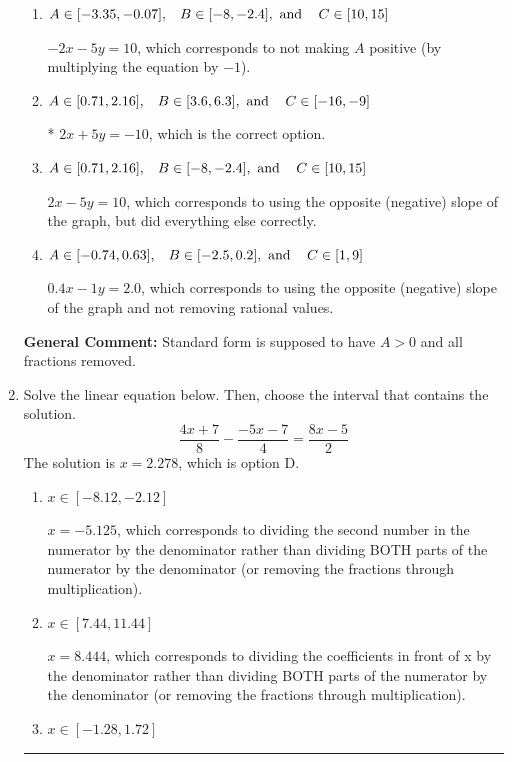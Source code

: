 \documentclass{extbook}[14pt]
\newcommand{\litem}[1]{\item #1

\rule{\textwidth}{0.4pt}}
\begin{document}
\begin{enumerate}
{\begin{enumerate}[label=\Alph*.]
 $0.4x + 1y = -2.0$, which corresponds to not removing rational values for Standard Form.
\item \( A \in [-3.35, -0.07], \hspace{3mm} B \in [-8, -2.4], \text{ and } \hspace{3mm} C \in [10, 15] \)

 $-2x - 5y = 10$, which corresponds to not making $A$ positive (by multiplying the equation by $-1$).
\item \( A \in [0.71, 2.16], \hspace{3mm} B \in [3.6, 6.3], \text{ and } \hspace{3mm} C \in [-16, -9] \)

* $2x + 5y = -10$, which is the correct option.
\item \( A \in [0.71, 2.16], \hspace{3mm} B \in [-8, -2.4], \text{ and } \hspace{3mm} C \in [10, 15] \)

 $2x - 5y = 10$, which corresponds to using the opposite (negative) slope of the graph, but did everything else correctly.
\item \( A \in [-0.74, 0.63], \hspace{3mm} B \in [-2.5, 0.2], \text{ and } \hspace{3mm} C \in [1, 9] \)

 $0.4x - 1y = 2.0$, which corresponds to using the opposite (negative) slope of the graph and not removing rational values.
\end{enumerate}

\textbf{General Comment:} Standard form is supposed to have $A > 0$ and all fractions removed.
}
\litem{
Solve the linear equation below. Then, choose the interval that contains the solution.
\[ \frac{4x + 7}{8} - \frac{-5x -7}{4} = \frac{8x -5}{2} \]The solution is \( x = 2.278 \), which is option D.\begin{enumerate}[label=\Alph*.]
\item \( x \in [-8.12, -2.12] \)

 $x = -5.125$, which corresponds to dividing the second number in the numerator by the denominator rather than dividing BOTH parts of the numerator by the denominator (or removing the fractions through multiplication).
\item \( x \in [7.44, 11.44] \)

 $x = 8.444$, which corresponds to dividing the coefficients in front of x by the denominator rather than dividing BOTH parts of the numerator by the denominator (or removing the fractions through multiplication).
\item \( x \in [-1.28, 1.72] \)


\end{enumerate}}
\end{enumerate}
\end{document}
